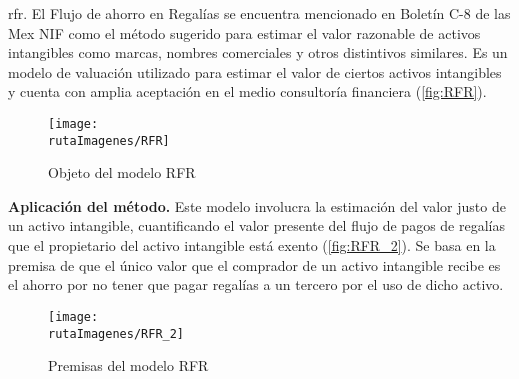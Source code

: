 \textcolor{secundario}{\gls{rfr}.} El  Flujo de ahorro en Regal\'ias se encuentra mencionado en Bolet\'in C-8 de las Mex NIF como el m\'etodo sugerido para estimar el valor razonable de activos intangibles como marcas, nombres comerciales y otros distintivos similares. Es un modelo de valuaci\'on utilizado para estimar el valor de ciertos activos intangibles  y cuenta con amplia aceptaci\'on en el medio consultor\'ia financiera (\autoref{fig:RFR}).

\begin{figure}[H]
\centering
\caption{Objeto del modelo RFR\label{fig:RFR}}
\texttt{[image: \\rutaImagenes/RFR]}\\
\end{figure}

\textbf{\textcolor{principal}{Aplicaci\'on del m\'etodo.}} Este modelo involucra la estimaci\'on del valor justo de un activo intangible, cuantificando el valor presente del flujo de pagos de regal\'ias que el propietario del activo intangible est\'a exento (\autoref{fig:RFR_2}). Se basa en la premisa de que el \'unico valor que el comprador de un activo intangible recibe es el ahorro por no tener que pagar regal\'ias a un tercero por el uso de dicho activo.

\begin{figure}[H]
\centering
\caption{Premisas del modelo RFR\label{fig:RFR_2}}
\texttt{[image: \\rutaImagenes/RFR\_2]}\\
\end{figure}